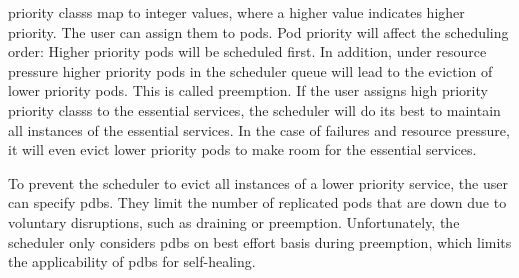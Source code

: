   \Glspl{priority class} map to integer values, where a higher value indicates higher priority.
  The user can assign them to pods.
  Pod priority will affect the scheduling order:
  Higher priority pods will be scheduled first.
  In addition, under resource pressure higher priority pods in the scheduler queue will lead to the eviction of lower priority pods.
  This is called preemption.
  If the user assigns high priority \glspl{priority class} to the essential services, the scheduler will do its best to maintain all instances of the essential services.
  In the case of failures and resource pressure, it will even evict lower priority pods to make room for the essential services.

  To prevent the scheduler to evict all instances of a lower priority service, the user can specify \glspl{pdb}.
  They limit the number of replicated pods that are down due to voluntary disruptions, such as draining or preemption.
  Unfortunately, the scheduler only considers \glspl{pdb} on best effort basis during preemption, which limits the applicability of \glspl{pdb} for self-healing.
